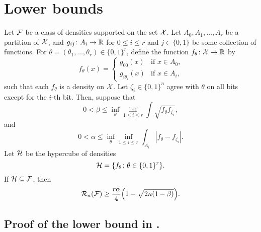 \section{Lower bounds}

\begin{lem}
  Let $\mathcal{F}$ be a class of densities supported on the set $\mathcal{X}$. Let
  $A_0, A_1, \dots, A_r$ be a partition of $\mathcal{X}$, and
  $g_{ij} \colon A_i \to \mathbb{R}$ for $0 \le i \le r$ and $j \in \{0, 1\}$
  be some collection of functions. For
  $\theta = (\theta_1, \dots, \theta_r) \in \{0, 1\}^r$, define the
  function $f_\theta \colon \mathcal{X} \to \mathbb{R}$ by
  \[
    f_\theta(x) = \left\{\begin{array}{ll}
                           g_{00}(x) & \mbox{if $x \in A_0$,} \\
                           g_{i \theta_i}(x) & \mbox{if $x \in A_i$,}
                    \end{array} \right.
  \]
  such that each $f_\theta$ is a density on $\mathcal{X}$. Let
  $\zeta_i \in \{0, 1\}^n$ agree with $\theta$ on all bits except for
  the $i$-th bit. Then, suppose that
  \[
    0 < \beta \le \inf_\theta \inf_{1 \le i \le r} \int \sqrt{f_\theta f_{\zeta_i}} ,
  \]
  and
  \[
    0 < \alpha \le \inf_\theta \inf_{1 \le i \le r} \int_{A_i} |f_\theta - f_{\zeta_i}| .
  \]
  Let $\mathcal{H}$ be the hypercube of densities
  \[
    \mathcal{H} = \{f_\theta \colon \theta \in \{0, 1\}^r\} .
  \]
  If $\mathcal{H} \subseteq \mathcal{F}$, then
  \[
    \sR_n(\sF) \ge \frac{r \alpha}{4} \left(1 - \sqrt{2 n (1 - \beta)}\right) .
  \]
\end{lem}

\subsection{Proof of the lower bound in .}

